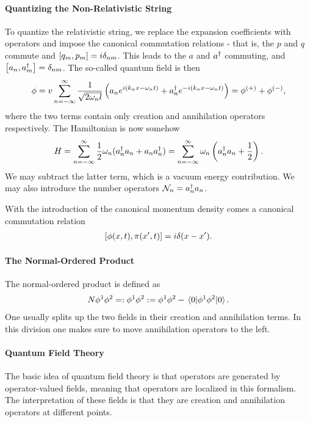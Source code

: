 \paragraph{Quantizing the Non-Relativistic String}
To quantize the relativistic string, we replace the expansion coefficients with operators and impose the canonical commutation relations - that is, the $p$ and $q$ commute and $\comm{q_{m}}{p_{m}} = i\delta_{nm}$. This leads to the $a$ and $a^{\dagger}$ commuting, and $\comm{a_{n}}{a_{m}\adj} = \delta_{nm}$. The so-called quantum field is then
\begin{align*}
	\phi = v\sum\limits_{n = -\infty}^{\infty}\frac{1}{\sqrt{2\omega_{n}l}}\left(a_{n}e^{i(k_{n}x - \omega_{n}t)} + a_{n}^{\dagger} e^{-i(k_{n}x - \omega_{n}t)}\right) = \phi^{(+)} + \phi^{(-)},
\end{align*}
where the two terms contain only creation and annihilation operators respectively. The Hamiltonian is now somehow
\begin{align*}
	H = \sum\limits_{n = -\infty}^{\infty}\frac{1}{2}\omega_{n}(a_{n}^{\dagger} a_{n} + a_{n}a_{n}^{\dagger}) = \sum\limits_{n = -\infty}^{\infty}\omega_{n}\left(a_{n}^{\dagger} a_{n} + \frac{1}{2}\right).
\end{align*}
We may subtract the latter term, which is a vacuum energy contribution. We may also introduce the number operators $\mathcal{N}_{n} = a_{n}^{\dagger} a_{n}$.

With the introduction of the canonical momentum density comes a canonical commutation relation
\begin{align*}
	\comm{\phi(x, t)}{\pi(x\p, t)} = i\delta(x - x\p).
\end{align*}

\paragraph{The Normal-Ordered Product}
The normal-ordered product is defined as
\begin{align*}
	N\phi^{1}\phi^{2} = :\phi^{1}\phi^{2}: = \phi^{1}\phi^{2} - \expval{\phi^{1}\phi^{2}}{0}.
\end{align*}
One usually splits up the two fields in their creation and annihilation terms. In this division one makes sure to move annihilation operators to the left.

\paragraph{Quantum Field Theory}
The basic idea of quantum field theory is that operators are generated by operator-valued fields, meaning that operators are localized in this formalism. The interpretation of these fields is that they are creation and annihilation operators at different points.

